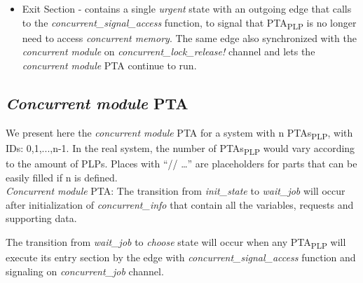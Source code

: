 \begin{itemize}
\item Exit Section - contains a single \textit{urgent} state with an outgoing edge that calls to the \textcolor{ColorUppaalFunction}{\textit{concurrent_signal_access}} function, to signal that PTA\textsubscript{PLP} is no longer need to access \textit{concurrent memory}. The same edge also synchronized with the \textit{concurrent module} on \textcolor{ColorUppaalChannel}{\textit{concurrent_lock_release!}} channel and lets the \textit{concurrent module} PTA continue to run.
\end{itemize}
\subsection{\textit{Concurrent module} PTA}
We present here the \textit{concurrent module} PTA for a system with n PTAs\textsubscript{PLP}, with IDs: 0,1,...,n-1. In the real system, the number of PTAs\textsubscript{PLP} would vary according to the amount of PLPs. Places with “// …” are placeholders for parts that can be easily filled if n is defined. \\
\textit{Concurrent module} PTA:  The transition from \textcolor{ColorUppaalState}{\textit{init_state}} to \textcolor{ColorUppaalState}{\textit{wait_job}} will occur after initialization of \textcolor{ColorEdgeUpdate}{\textit{concurrent_info}} that contain all the variables, requests and supporting data. 
\par The transition from \textcolor{ColorUppaalState}{\textit{wait_job}} to \textcolor{ColorUppaalState}{\textit{choose}} state will occur when any PTA\textsubscript{PLP} will execute its entry section by the edge with \textcolor{ColorUppaalFunction}{\textit{concurrent_signal_access}} function and signaling on \textcolor{ColorUppaalChannel}{\textit{concurrent_job}} channel ​. 
